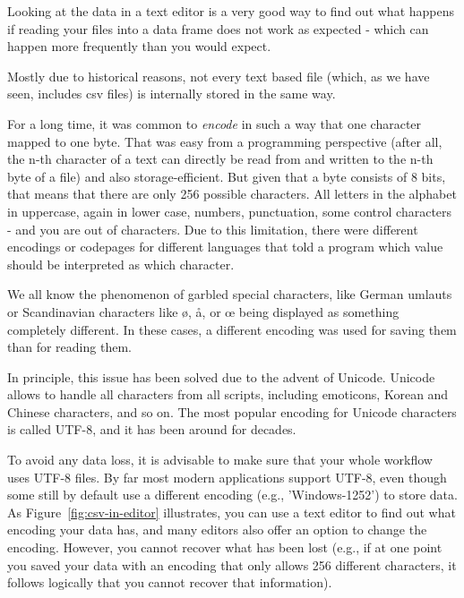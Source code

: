 Looking at the data in a text editor is a very good way to find out what happens if reading your files into a data frame does not work as expected - which can happen more frequently than you would expect.

Mostly due to historical reasons, not every text based file (which, as we have seen, includes csv files) is internally stored in the same way.

For a long time, it was common to \emph{encode} in such a way that one character mapped to one byte. That was easy from a programming perspective (after all, the n-th character of a text can directly be read from and written to the n-th byte of a file) and also storage-efficient. But given that a byte consists of 8 bits, that means that there are only 256 possible characters. All letters in the alphabet in uppercase, again in lower case, numbers, punctuation, some control characters - and you are out of characters. Due to this limitation, there were different encodings or codepages for different languages that told a program which value should be interpreted as which character.

We all know the phenomenon of garbled special characters, like German umlauts or Scandinavian characters like ø, å, or œ being displayed as something completely different. In these cases, a different encoding was used for saving them than for reading them.

In principle, this issue has been solved due to the advent of Unicode. Unicode allows to handle all characters from all scripts, including emoticons, Korean and Chinese characters, and so on. The most popular encoding for Unicode characters is called UTF-8, and it has been around for decades. 

To avoid any data loss, it is advisable to make sure that your whole workflow uses UTF-8 files. By far most modern applications support UTF-8, even though some still by default use a different encoding (e.g., 'Windows-1252') to store data. As Figure~\ref{fig:csv-in-editor} illustrates, you can use a text editor to find out what encoding your data has, and many editors also offer an option to change the encoding. However, you cannot recover what has been lost (e.g., if at one point you saved your data with an encoding that only allows 256 different characters, it follows logically that you cannot recover that information).


